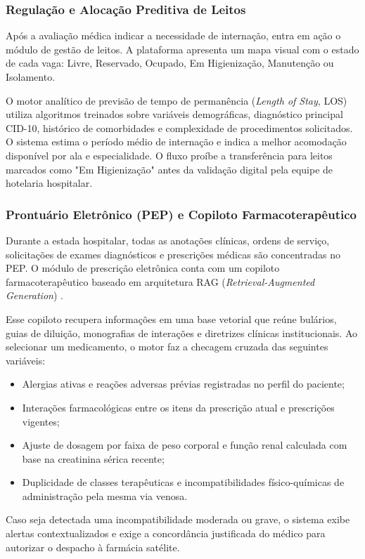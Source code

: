 \subsubsection{Regulação e Alocação Preditiva de Leitos}
Após a avaliação médica indicar a necessidade de internação, entra em ação o módulo de gestão de leitos. A plataforma apresenta um mapa visual com o estado de cada vaga: Livre, Reservado, Ocupado, Em Higienização, Manutenção ou Isolamento.

O motor analítico de previsão de tempo de permanência (\textit{Length of Stay}, LOS) utiliza algoritmos treinados sobre variáveis demográficas, diagnóstico principal CID-10, histórico de comorbidades e complexidade de procedimentos solicitados. O sistema estima o período médio de internação e indica a melhor acomodação disponível por ala e especialidade. O fluxo proíbe a transferência para leitos marcados como "Em Higienização" antes da validação digital pela equipe de hotelaria hospitalar.

\subsubsection{Prontuário Eletrônico (PEP) e Copiloto Farmacoterapêutico}
Durante a estada hospitalar, todas as anotações clínicas, ordens de serviço, solicitações de exames diagnósticos e prescrições médicas são concentradas no PEP. O módulo de prescrição eletrônica conta com um copiloto farmacoterapêutico baseado em arquitetura RAG (\textit{Retrieval-Augmented Generation}) \cite{lewis_rag:2020}.

Esse copiloto recupera informações em uma base vetorial que reúne bulários, guias de diluição, monografias de interações e diretrizes clínicas institucionais. Ao selecionar um medicamento, o motor faz a checagem cruzada das seguintes variáveis:
\begin{itemize}
    \item Alergias ativas e reações adversas prévias registradas no perfil do paciente;
    \item Interações farmacológicas entre os itens da prescrição atual e prescrições vigentes;
    \item Ajuste de dosagem por faixa de peso corporal e função renal calculada com base na creatinina sérica recente;
    \item Duplicidade de classes terapêuticas e incompatibilidades físico-químicas de administração pela mesma via venosa.
\end{itemize}
Caso seja detectada uma incompatibilidade moderada ou grave, o sistema exibe alertas contextualizados e exige a concordância justificada do médico para autorizar o despacho à farmácia satélite.

